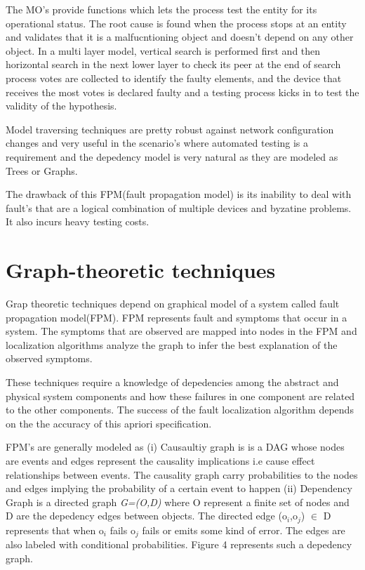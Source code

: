 \documentclass[10pt]{sigplan-proc-varsize}
\begin{document}
The MO's provide functions which lets the process test the entity for its operational status.  The root cause is found when the process stops at an entity and validates that it is a malfucntioning object and doesn't depend on any other object. In a multi layer model, vertical search is performed first and then horizontal search in the next lower layer to check its peer at the end of search process votes are collected to identify the faulty elements, and the device that receives the most votes is declared faulty and a testing process kicks in to test the validity of the hypothesis. 

Model traversing techniques are pretty robust against network configuration changes and very useful in the scenario's where automated testing is a requirement and the depedency model is very natural as they are modeled as Trees or Graphs. 

The drawback of this FPM(fault propagation model) is its inability to deal with fault's that are a logical combination of multiple devices and byzatine problems. It also incurs heavy testing costs. 

\section{Graph-theoretic techniques}
 
Grap theoretic techniques depend on graphical model of a system called fault propagation model(FPM). FPM represents fault and symptoms that occur in a system. 
The symptoms that are observed are mapped into nodes in the FPM and localization algorithms analyze the graph to infer the best explanation of the observed symptoms. 

These techniques require a knowledge of depedencies among the abstract and physical system components and how these failures in one component are related to the
other components. The success of the fault localization algorithm depends on the the accuracy of this apriori specification.

FPM's are generally modeled as (i) Causaultiy graph is is a DAG whose nodes are events and edges represent the causality implications i.e cause effect relationships 
between events. The causality graph carry probabilities to the nodes and edges implying the probability of a certain event to happen (ii) Dependency Graph is a directed graph {\it{G=(O,D)}} where O represent a finite set of nodes and D are the depedency edges between objects. 
The directed edge (o$_{i}$,o$_{j}$) $\in$ D represents that when o$_{i}$ fails o$_{j}$ fails or emits some kind of error. 
The edges are also labeled with conditional probabilities. Figure 4 represents such a depedency graph.
\end{document}
